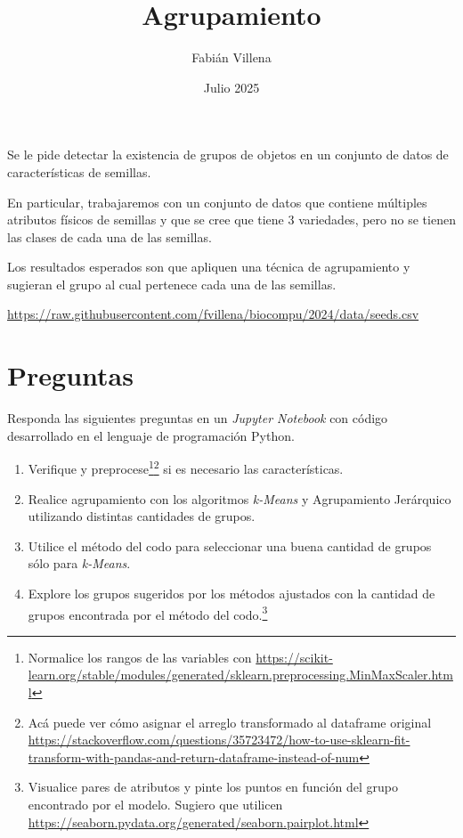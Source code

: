 \documentclass{article}
\title{Agrupamiento}
\author{Fabián Villena}
\date{Julio 2025}
\begin{document}
\maketitle

Se le pide detectar la existencia de grupos de objetos en un conjunto de datos de características de semillas.

En particular, trabajaremos con un conjunto de datos que contiene múltiples atributos físicos de semillas y que se cree que tiene 3 variedades, pero no se tienen las clases de cada una de las semillas.

Los resultados esperados son que apliquen una técnica de agrupamiento y sugieran el grupo al cual pertenece cada una de las semillas. 

\begin{center}
    \url{https://raw.githubusercontent.com/fvillena/biocompu/2024/data/seeds.csv}
\end{center}

\section*{Preguntas}

Responda las siguientes preguntas en un \textit{Jupyter Notebook} con código desarrollado en el lenguaje de programación Python.

\begin{enumerate}
    \item Verifique y preprocese\footnote{Normalice los rangos de las variables con \url{https://scikit-learn.org/stable/modules/generated/sklearn.preprocessing.MinMaxScaler.html}}\footnote{Acá puede ver cómo asignar el arreglo transformado al dataframe original \url{https://stackoverflow.com/questions/35723472/how-to-use-sklearn-fit-transform-with-pandas-and-return-dataframe-instead-of-num}} si es necesario las características.
    \item Realice agrupamiento con los algoritmos \textit{k-Means} y Agrupamiento Jerárquico utilizando distintas cantidades de grupos.
    \item Utilice el método del codo para seleccionar una buena cantidad de grupos sólo para \textit{k-Means}.
    \item Explore los grupos sugeridos por los métodos ajustados con la cantidad de grupos encontrada por el método del codo.\footnote{Visualice pares de atributos y pinte los puntos en función del grupo encontrado por el modelo. Sugiero que utilicen \url{https://seaborn.pydata.org/generated/seaborn.pairplot.html}}
\end{enumerate}
\end{document}
